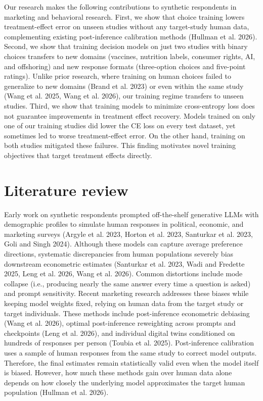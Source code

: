 \documentclass[
  11pt,
  letterpaper,
]{article}
\begin{document}
Our research makes the following contributions to synthetic respondents
in marketing and behavioral research. First, we show that choice
training lowers treatment-effect error on unseen studies without any
target-study human data, complementing existing post-inference
calibration methods (Hullman et al. 2026). Second, we show that training
decision models on just two studies with binary choices transfers to new
domains (vaccines, nutrition labels, consumer rights, AI, and
offshoring) and new response formats (three-option choices and
five-point ratings). Unlike prior research, where training on human
choices failed to generalize to new domains (Brand et al. 2023) or even
within the same study (Wang et al. 2025, Wang et al. 2026), our training
regime transfers to unseen studies. Third, we show that training models
to minimize cross-entropy loss does not guarantee improvements in
treatment effect recovery. Models trained on only one of our training
studies did lower the CE loss on every test dataset, yet sometimes led
to worse treatment-effect error. On the other hand, training on both
studies mitigated these failures. This finding motivates novel training
objectives that target treatment effects directly.

\section{Literature review}\label{sec-lit}

Early work on synthetic respondents prompted off-the-shelf generative
LLMs with demographic profiles to simulate human responses in political,
economic, and marketing surveys (Argyle et al. 2023, Horton et al. 2023,
Santurkar et al. 2023, Goli and Singh 2024). Although these models can
capture average preference directions, systematic discrepancies from
human populations severely bias downstream econometric estimates
(Santurkar et al. 2023, Wadi and Fredette 2025, Leng et al. 2026, Wang
et al. 2026). Common distortions include mode collapse (i.e., producing
nearly the same answer every time a question is asked) and prompt
sensitivity. Recent marketing research addresses these biases while
keeping model weights fixed, relying on human data from the target study
or target individuals. These methods include post-inference econometric
debiasing (Wang et al. 2026), optimal post-inference reweighting across
prompts and checkpoints (Leng et al. 2026), and individual digital twins
conditioned on hundreds of responses per person (Toubia et al. 2025).
Post-inference calibration uses a sample of human responses from the
same study to correct model outputs. Therefore, the final estimates
remain statistically valid even when the model itself is biased.
However, how much these methods gain over human data alone depends on
how closely the underlying model approximates the target human
population (Hullman et al. 2026).
\end{document}
